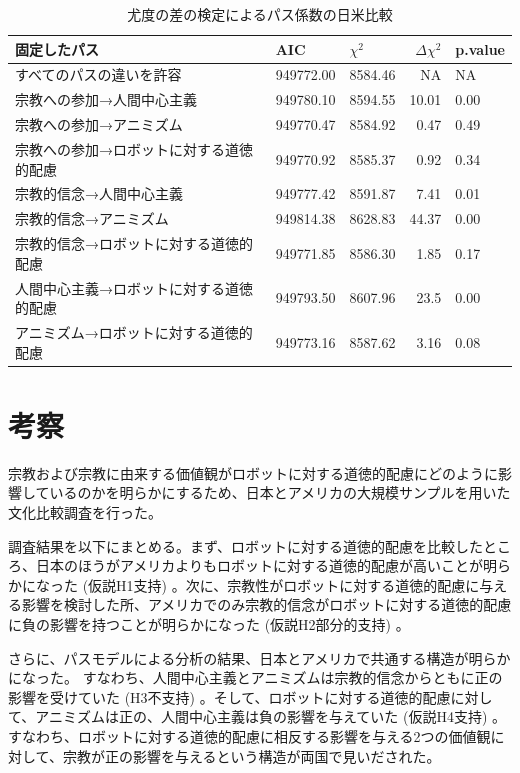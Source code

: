\documentclass[a4j,12pt]{jreport}
\begin{document}
\begin{table}[H]
\centering
\caption[パス係数の日米比較]{尤度の差の検定によるパス係数の日米比較}
\label{tab:SEMPathComp}
\begin{tabular}{@{}lllrl@{}}
\toprule
    固定したパス          & AIC       & $\chi^2$ & $\Delta \chi^2$ & p.value \\ \midrule
すべてのパスの違いを許容 & 949772.00 & 8584.46 & NA          & NA      \\
宗教への参加→人間中心主義   & 949780.10 & 8594.55 & 10.01  & 0.00    \\
宗教への参加→アニミズム & 949770.47 & 8584.92 & ~0.47  & 0.49    \\
宗教への参加→ロボットに対する道徳的配慮 & 949770.92 & 8585.37 & ~0.92  & 0.34    \\
宗教的信念→人間中心主義 & 949777.42 & 8591.87 & ~7.41  & 0.01    \\
宗教的信念→アニミズム & 949814.38 & 8628.83 & 44.37       & 0.00    \\
宗教的信念→ロボットに対する道徳的配慮 & 949771.85 & 8586.30 & ~1.85  & 0.17    \\
人間中心主義→ロボットに対する道徳的配慮 & 949793.50 & 8607.96 & 23.5       & 0.00    \\
アニミズム→ロボットに対する道徳的配慮 & 949773.16 & 8587.62 & ~3.16  & 0.08    \\ \bottomrule
\end{tabular}
\end{table}




\section{考察}
宗教および宗教に由来する価値観がロボットに対する道徳的配慮にどのように影響しているのかを明らかにするため、日本とアメリカの大規模サンプルを用いた文化比較調査を行った。


調査結果を以下にまとめる。まず、ロボットに対する道徳的配慮を比較したところ、日本のほうがアメリカよりもロボットに対する道徳的配慮が高いことが明らかになった (仮説H1支持) 。次に、宗教性がロボットに対する道徳的配慮に与える影響を検討した所、アメリカでのみ宗教的信念がロボットに対する道徳的配慮に負の影響を持つことが明らかになった (仮説H2部分的支持) 。


さらに、パスモデルによる分析の結果、日本とアメリカで共通する構造が明らかになった。
すなわち、人間中心主義とアニミズムは宗教的信念からともに正の影響を受けていた (H3不支持) 。そして、ロボットに対する道徳的配慮に対して、アニミズムは正の、人間中心主義は負の影響を与えていた (仮説H4支持) 。すなわち、ロボットに対する道徳的配慮に相反する影響を与える2つの価値観に対して、宗教が正の影響を与えるという構造が両国で見いだされた。
\end{document}
